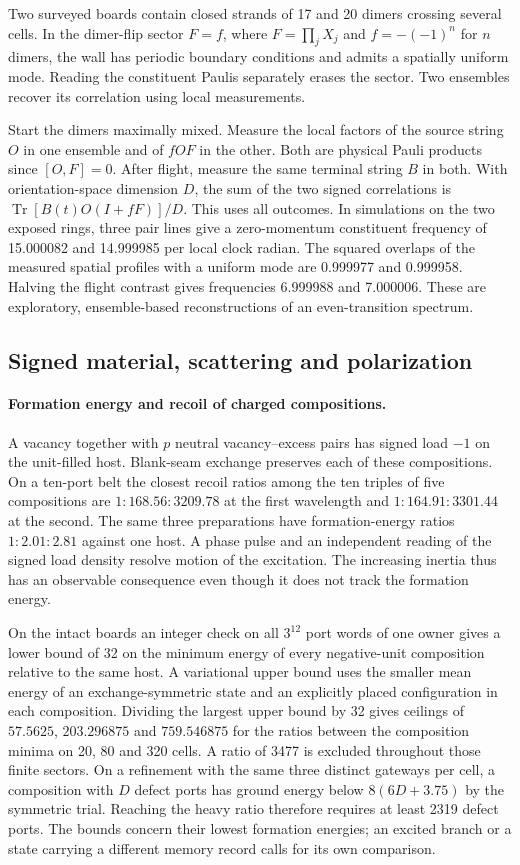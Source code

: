\documentclass[11pt]{article}
\theoremstyle{definition}
\theoremstyle{remark}
\theoremstyle{plain}
\begin{document}
Two surveyed boards contain closed strands of 17 and 20 dimers
crossing several cells. In the dimer-flip sector $F=f$, where
$F=\prod_j X_j$ and $f=-(-1)^n$ for $n$ dimers, the wall has periodic
boundary conditions and admits a spatially uniform mode. Reading
the constituent Paulis separately erases the sector. Two ensembles
recover its correlation using local measurements.

Start the dimers maximally mixed. Measure the local factors of the source
string $O$ in one ensemble and of $fOF$ in the other. Both are physical
Pauli products since $[O,F]=0$. After flight, measure the same terminal
string $B$ in both. With orientation-space dimension $D$, the sum of
the two signed correlations is $\operatorname{Tr}[B(t)O(I+fF)]/D$.
This uses all outcomes. In simulations on the two exposed rings,
three pair lines give a zero-momentum constituent frequency of
15.000082 and 14.999985 per local clock radian. The squared overlaps
of the measured spatial profiles with a uniform mode are 0.999977 and
0.999958. Halving the flight contrast gives frequencies 6.999988 and
7.000006. These are exploratory, ensemble-based reconstructions of an
even-transition spectrum.

\subsection{Signed material, scattering and polarization}

\paragraph{Formation energy and recoil of charged compositions.}
A vacancy together with $p$ neutral vacancy--excess pairs has signed
load $-1$ on the unit-filled host. Blank-seam exchange preserves each
of these compositions. On a ten-port belt the closest recoil ratios
among the ten triples of five compositions are $1:168.56:3209.78$ at
the first wavelength and $1:164.91:3301.44$ at the second. The same
three preparations have formation-energy ratios $1:2.01:2.81$ against
one host. A phase pulse and an independent reading of the signed load
density resolve motion of the excitation. The increasing inertia thus
has an observable consequence even though it does not track the
formation energy.

On the intact boards an integer check on all $3^{12}$ port words of
one owner gives a lower bound of 32 on the minimum energy of every negative-unit
composition relative to the same host. A variational upper bound uses the
smaller mean energy of an exchange-symmetric state and an explicitly
placed configuration in each composition. Dividing the largest upper
bound by 32 gives ceilings of $57.5625$, $203.296875$ and $759.546875$
for the ratios between the composition minima on 20, 80 and 320 cells.
A ratio of 3477 is excluded throughout those finite sectors. On a
refinement with the same three distinct gateways per cell, a
composition with $D$ defect ports has ground energy below
$8(6D+3.75)$ by the symmetric trial. Reaching the heavy ratio
therefore requires at least 2319 defect ports. The bounds concern their lowest formation energies; an excited branch or
a state carrying a different memory record calls for its own comparison.
\end{document}
